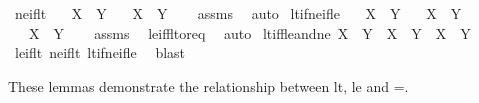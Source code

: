 \begin{isabellebody}
\begin{isamarkuptext}
\end{isamarkuptext}\isamarkuptrue%
\isamarkupfalse%
\ ne{\isacharunderscore}{\kern0pt}if{\isacharunderscore}{\kern0pt}lt{\isacharcolon}{\kern0pt}\isanewline
\ \ \ {\isachardoublequoteopen}X\ {\isacharless}{\kern0pt}\ Y{\isachardoublequoteclose}\isanewline
\ \ \ {\isachardoublequoteopen}X\ {\isasymnoteq}\ Y{\isachardoublequoteclose}\isanewline
%
\isadelimproof
\ \ %
\endisadelimproof
%
\isatagproof
{}\isamarkupfalse%
\ assms\ \isamarkupfalse%
\ auto%
\endisatagproof
{\isafoldproof}%
%
\isadelimproof
\isanewline
%
\endisadelimproof
\isanewline
{}\isamarkupfalse%
\ lt{\isacharunderscore}{\kern0pt}if{\isacharunderscore}{\kern0pt}ne{\isacharunderscore}{\kern0pt}if{\isacharunderscore}{\kern0pt}le{\isacharcolon}{\kern0pt}\isanewline
\ \ \ {\isachardoublequoteopen}X\ {\isasymle}\ Y{\isachardoublequoteclose}\isanewline
\ \ \ {\isachardoublequoteopen}X\ {\isasymnoteq}\ Y{\isachardoublequoteclose}\isanewline
\ \ \ {\isachardoublequoteopen}X\ {\isacharless}{\kern0pt}\ Y{\isachardoublequoteclose}\isanewline
%
\isadelimproof
\ \ %
\endisadelimproof
%
\isatagproof
{}\isamarkupfalse%
\ assms\ \isamarkupfalse%
\ le{\isacharunderscore}{\kern0pt}iff{\isacharunderscore}{\kern0pt}lt{\isacharunderscore}{\kern0pt}or{\isacharunderscore}{\kern0pt}eq\ \isamarkupfalse%
\ auto%
\endisatagproof
{\isafoldproof}%
%
\isadelimproof
\isanewline
%
\endisadelimproof
\isanewline
{}\isamarkupfalse%
\ lt{\isacharunderscore}{\kern0pt}iff{\isacharunderscore}{\kern0pt}le{\isacharunderscore}{\kern0pt}and{\isacharunderscore}{\kern0pt}ne{\isacharcolon}{\kern0pt}\ {\isachardoublequoteopen}X\ {\isacharless}{\kern0pt}\ Y\ {\isasymlongleftrightarrow}\ X\ {\isasymle}\ Y\ {\isasymand}\ X\ {\isasymnoteq}\ Y{\isachardoublequoteclose}\isanewline
%
\isadelimproof
\ \ %
\endisadelimproof
%
\isatagproof
{}\isamarkupfalse%
\ le{\isacharunderscore}{\kern0pt}if{\isacharunderscore}{\kern0pt}lt\ ne{\isacharunderscore}{\kern0pt}if{\isacharunderscore}{\kern0pt}lt\ lt{\isacharunderscore}{\kern0pt}if{\isacharunderscore}{\kern0pt}ne{\isacharunderscore}{\kern0pt}if{\isacharunderscore}{\kern0pt}le\ \isamarkupfalse%
\ blast%
\endisatagproof
{\isafoldproof}%
%
\isadelimproof
%
\endisadelimproof
%
\begin{isamarkuptext}%
These lemmas demonstrate the relationship between lt, le and =.%
\end{isamarkuptext}\isamarkuptrue%

\end{isabellebody}
